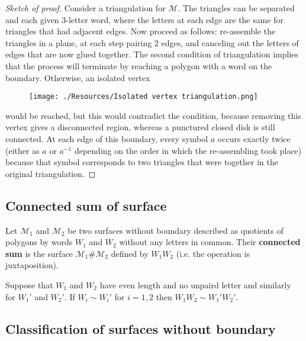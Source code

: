 \documentclass[12pt, a4paper]{article}
\begin{document}
\begin{proof}[Sketch of proof]
    Consider a triangulation for \(\mathcal{M}\). The triangles can be separated and each given 3-letter word, where the letters at each edge are the same for triangles that had adjacent edges. Now proceed as follows: re-assemble the triangles in a plane, at each step pairing 2 edges, and canceling out the letters of edges that are now glued together. The second condition of triangulation implies that the process will terminate by reaching a polygon with a word on the boundary. Otherwise, an isolated vertex 
    \begin{figure}[H]
         \begin{center}
             \texttt{[image: ./Resources/Isolated vertex triangulation.png]}
         \end{center}
    \end{figure}
    \noindent would be reached, but this would contradict the condition, because removing this vertex gives a disconnected region, whereas a punctured closed disk is still connected. At each edge of this boundary, every symbol \(a\) occurs exactly twice (either as \(a\) or \(a^{-1}\) depending on the order in which the re-assembling took place) because that symbol corresponds to two triangles that were together in the original triangulation.
\end{proof}

\subsection{Connected sum of surface}

\begin{definition}
    Let \(\mathcal{M}_1\) and \(\mathcal{M}_2\) be two surfaces without boundary described as quotients of polygons by words \(W_1\) and \(W_2\) without any letters in common. Their \textbf{connected sum} is the surface \(\mathcal{M}_1 \# \mathcal{M}_2\) defined by \(W_1 W_2\) (i.e. the operation is juxtaposition).
\end{definition}

\begin{lemma}
    Suppose that \(W_1\) and \(W_2\) have even length and no unpaird letter and similarly for \(W_1'\) and \(W_2'\). If \(W_i \sim W_i'\) for \(i=1,2\) then \(W_1W_2 \sim W_1'W_2'\).
\end{lemma}

\subsection{Classification of surfaces without boundary}
\end{document}

